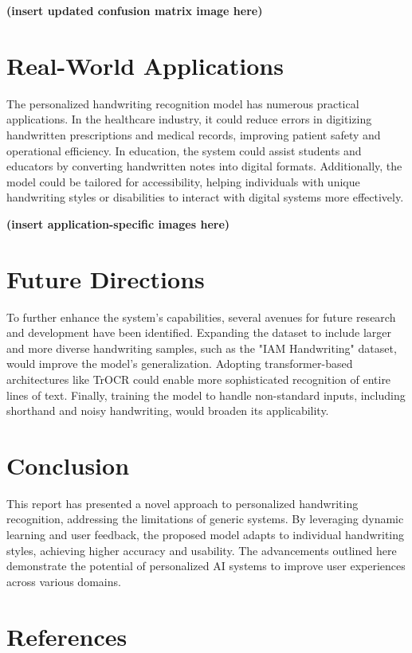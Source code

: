 \documentclass[journal]{IEEEtran}
\begin{document}
\textbf{(insert updated confusion matrix image here)}

\section{Real-World Applications}
The personalized handwriting recognition model has numerous practical applications. In the healthcare industry, it could reduce errors in digitizing handwritten prescriptions and medical records, improving patient safety and operational efficiency. In education, the system could assist students and educators by converting handwritten notes into digital formats. Additionally, the model could be tailored for accessibility, helping individuals with unique handwriting styles or disabilities to interact with digital systems more effectively.

\textbf{(insert application-specific images here)}

\section{Future Directions}
To further enhance the system's capabilities, several avenues for future research and development have been identified. Expanding the dataset to include larger and more diverse handwriting samples, such as the "IAM Handwriting" dataset, would improve the model's generalization. Adopting transformer-based architectures like TrOCR could enable more sophisticated recognition of entire lines of text. Finally, training the model to handle non-standard inputs, including shorthand and noisy handwriting, would broaden its applicability.

\section{Conclusion}
This report has presented a novel approach to personalized handwriting recognition, addressing the limitations of generic systems. By leveraging dynamic learning and user feedback, the proposed model adapts to individual handwriting styles, achieving higher accuracy and usability. The advancements outlined here demonstrate the potential of personalized AI systems to improve user experiences across various domains.

\section{References}
\nocite{*}
\printbibliography
\end{document}
